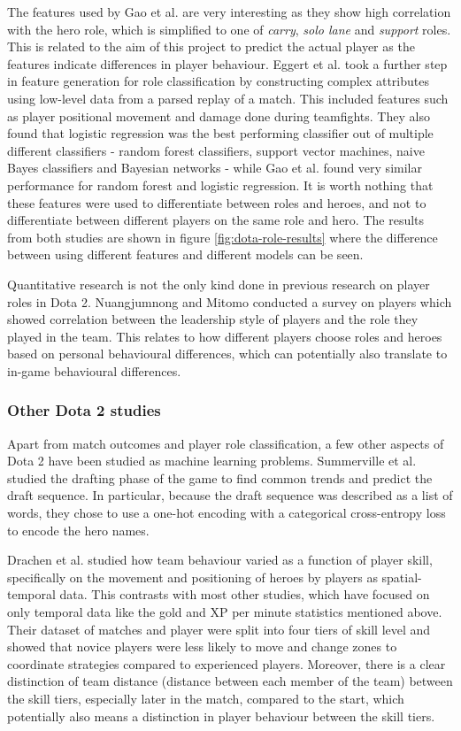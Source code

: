 \documentclass[Report.tex]{subfiles}
\begin{document}
The features used by Gao et al. are very interesting as they show high correlation with the hero role, which is simplified to one of \textit{carry}, \textit{solo lane} and \textit{support} roles. This is related to the aim of this project to predict the actual player as the features indicate differences in player behaviour. Eggert et al. \cite{dota-eggert} took a further step in feature generation for role classification by constructing complex attributes using low-level data from a parsed replay of a match. This included features such as player positional movement and damage done during teamfights. They also found that logistic regression was the best performing classifier out of multiple different classifiers - random forest classifiers, support vector machines, naive Bayes classifiers and Bayesian networks - while Gao et al. \cite{dota-gao} found very similar performance for random forest and logistic regression. It is worth nothing that these features were used to differentiate between roles and heroes, and not to differentiate between different players on the same role and hero. The results from both studies are shown in figure \ref{fig:dota-role-results} where the difference between using different features and different models can be seen.

Quantitative research is not the only kind done in previous research on player roles in Dota 2. Nuangjumnong and Mitomo \cite{dota-leadership} conducted a survey on players which showed correlation between the leadership style of players and the role they played in the team. This relates to how different players choose roles and heroes based on personal behavioural differences, which can potentially also translate to in-game behavioural differences.  

\subsubsection{Other Dota 2 studies}
Apart from match outcomes and player role classification, a few other aspects of Dota 2 have been studied as machine learning problems. Summerville et al. \cite{dota-draft} studied the drafting phase of the game to find common trends and predict the draft sequence. In particular, because the draft sequence was described as a list of words, they chose to use a one-hot encoding with a categorical cross-entropy loss to encode the hero names. 

Drachen et al. \cite{dota-skill} studied how team behaviour varied as a function of player skill, specifically on the movement and positioning of heroes by players as spatial-temporal data. This contrasts with most other studies, which have focused on only temporal data like the gold and XP per minute statistics mentioned above. Their dataset of matches and player were split into four tiers of skill level and showed that novice players were less likely to move and change zones to coordinate strategies compared to experienced players. Moreover, there is a clear distinction of team distance (distance between each member of the team) between the skill tiers, especially later in the match, compared to the start, which potentially also means a distinction in player behaviour between the skill tiers. 
\end{document}
